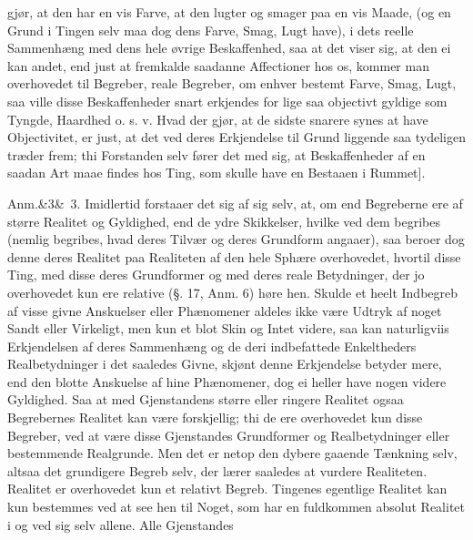 \documentclass[12pt]{book}
\makeatletter
\def\sperr#1{#1}%
\def\textit#1{#1}%
\def\emph#1{#1}%
\newcommand{\sperr}[1]{\textls[180]{#1}}
\newcommand{\umph}[2][misc]{%
  \@ifundefined{umph@#1@on}{#2}{\emph{#2}}}
\newcommand{\anm}[1]{%
  \par\vspace{0.5\baselineskip}%
  \noindent\hspace{\parindent}\sperr{Anm.}\ifx&#1&\else~\textit{#1}.\fi
  \enspace\ignorespaces
}
\newcommand{\opage}[1]{\marginnote{\footnotesize\textit{[#1]}}}
\makeatother
\begin{document}
gjør, at den har en vis Farve, at den lugter og smager paa en vis Maade, (og en Grund i
Tingen selv maa dog dens Farve, Smag, Lugt have), i dets reelle Sammenhæng med dens hele
øvrige Beskaffenhed, saa at det viser sig, at den ei kan andet, end just at fremkalde
saadanne Affectioner hos os, kommer man overhovedet til Begreber, reale Begreber, om
enhver bestemt Farve, Smag, Lugt, saa ville disse Beskaffenheder snart erkjendes for
lige saa objectivt gyldige som Tyngde, Haardhed o. s. v. Hvad der gjør, at de sidste
snarere synes at have Objectivitet, er just, at det ved deres Erkjendelse til Grund
liggende \umph[schwab]{Intelligente} saa tydeligen træder frem; thi Forstanden selv fører det med sig,
at Beskaffenheder af en saadan Art maae findes hos Ting, som skulle have en Bestaaen i
Rummet].

\anm{3} Imidlertid forstaaer det sig af sig selv, at, om end Begreberne ere af større
Realitet og Gyldighed, end de ydre Skikkelser, hvilke ved dem begribes (nemlig begribes,
hvad
\opage{152} deres Tilvær og deres Grundform angaaer), saa beroer dog denne deres Realitet paa
Realiteten af den hele Sphære overhovedet, hvortil disse Ting, med disse deres
Grundformer og med deres reale Betydninger, der jo overhovedet kun ere relative
(§. 17, Anm. 6) høre hen. Skulde et heelt Indbegreb af visse givne Anskuelser eller
Phænomener aldeles ikke være Udtryk af noget Sandt eller Virkeligt, men kun et blot Skin
og Intet videre, saa kan naturligviis Erkjendelsen af deres Sammenhæng og de deri
indbefattede Enkeltheders Realbetydninger i det saaledes Givne, skjønt denne Erkjendelse
betyder mere, end den blotte Anskuelse af hine Phænomener, dog ei heller have nogen
videre Gyldighed. Saa at med Gjenstandens større eller ringere Realitet ogsaa
Begrebernes Realitet kan være forskjellig; thi de ere overhovedet kun disse Begreber,
ved at være disse Gjenstandes Grundformer og Realbetydninger eller bestemmende
Realgrunde. Men det er netop den dybere gaaende Tænkning selv, altsaa det grundigere
Begreb selv, der lærer saaledes at vurdere Realiteten. Realitet er overhovedet kun et
relativt Begreb. Tingenes egentlige Realitet kan kun bestemmes ved at see hen til Noget,
som har en fuldkommen absolut Realitet i og ved sig selv allene. Alle Gjenstandes
\end{document}
